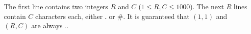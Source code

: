 The first line contains two integers $R$ and $C$ ($1 \le R, C \le 1000$).
The next $R$ lines contain $C$ characters each, either . or #.
It is guaranteed that $(1,1)$ and $(R,C)$ are always ..